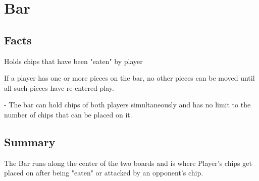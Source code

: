 \section{Bar}

\subsection{Facts}

\begin{dashed}
	\item Holds chips that have been "eaten" by player
	\item If a player has one or more pieces on the bar,
      no other pieces can be moved until all such pieces
      have re-entered play.
\end{dashed}

\noindent
\newline{} - The bar can hold chips of both players simultaneously
and has no limit to the number of chips that can be placed on it.

\subsection{Summary}
The Bar runs along the center of the two boards and is where Player's chips get placed
on after being "eaten" or attacked by an opponent's chip.
